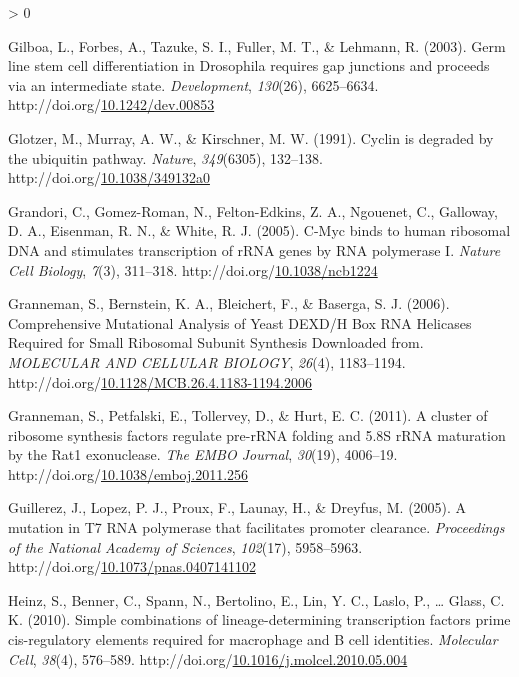 \documentclass[12pt,oneside]{reedthesis}
\newlength{\cslhangindent}
\newenvironment{CSLReferences}[2] %
 {%
  \setlength{\parindent}{0pt}
  \ifodd #1 \everypar{\setlength{\hangindent}{\cslhangindent}}\ignorespaces\fi
  \ifnum #2 > 0
  \setlength{\parskip}{#2\baselineskip}
  \fi
 }%
 {}
\begin{document}
\begin{CSLReferences}{1}{0}
\leavevmode\hypertarget{ref-gilboaGermLineStem2003}{}%
Gilboa, L., Forbes, A., Tazuke, S. I., Fuller, M. T., \& Lehmann, R. (2003). Germ line stem cell differentiation in {Drosophila} requires gap junctions and proceeds via an intermediate state. \emph{Development}, \emph{130}(26), 6625--6634. http://doi.org/\href{https://doi.org/10.1242/dev.00853}{10.1242/dev.00853}

\leavevmode\hypertarget{ref-glotzerCyclinDegradedUbiquitin1991}{}%
Glotzer, M., Murray, A. W., \& Kirschner, M. W. (1991). Cyclin is degraded by the ubiquitin pathway. \emph{Nature}, \emph{349}(6305), 132--138. http://doi.org/\href{https://doi.org/10.1038/349132a0}{10.1038/349132a0}

\leavevmode\hypertarget{ref-grandoriCMycBindsHuman2005}{}%
Grandori, C., Gomez-Roman, N., Felton-Edkins, Z. A., Ngouenet, C., Galloway, D. A., Eisenman, R. N., \& White, R. J. (2005). C-{Myc} binds to human ribosomal {DNA} and stimulates transcription of {rRNA} genes by {RNA} polymerase {I}. \emph{Nature Cell Biology}, \emph{7}(3), 311--318. http://doi.org/\href{https://doi.org/10.1038/ncb1224}{10.1038/ncb1224}

\leavevmode\hypertarget{ref-Granneman2006}{}%
Granneman, S., Bernstein, K. A., Bleichert, F., \& Baserga, S. J. (2006). Comprehensive {Mutational Analysis} of {Yeast DEXD}/{H Box RNA Helicases Required} for {Small Ribosomal Subunit Synthesis Downloaded} from. \emph{MOLECULAR AND CELLULAR BIOLOGY}, \emph{26}(4), 1183--1194. http://doi.org/\href{https://doi.org/10.1128/MCB.26.4.1183-1194.2006}{10.1128/MCB.26.4.1183-1194.2006}

\leavevmode\hypertarget{ref-Granneman2011}{}%
Granneman, S., Petfalski, E., Tollervey, D., \& Hurt, E. C. (2011). A cluster of ribosome synthesis factors regulate pre-{rRNA} folding and 5.{8S rRNA} maturation by the {Rat1} exonuclease. \emph{The EMBO Journal}, \emph{30}(19), 4006--19. http://doi.org/\href{https://doi.org/10.1038/emboj.2011.256}{10.1038/emboj.2011.256}

\leavevmode\hypertarget{ref-guillerezMutationT7RNA2005}{}%
Guillerez, J., Lopez, P. J., Proux, F., Launay, H., \& Dreyfus, M. (2005). A mutation in {T7 RNA} polymerase that facilitates promoter clearance. \emph{Proceedings of the National Academy of Sciences}, \emph{102}(17), 5958--5963. http://doi.org/\href{https://doi.org/10.1073/pnas.0407141102}{10.1073/pnas.0407141102}

\leavevmode\hypertarget{ref-heinzSimpleCombinationsLineagedetermining2010}{}%
Heinz, S., Benner, C., Spann, N., Bertolino, E., Lin, Y. C., Laslo, P., \ldots{} Glass, C. K. (2010). Simple combinations of lineage-determining transcription factors prime cis-regulatory elements required for macrophage and {B} cell identities. \emph{Molecular Cell}, \emph{38}(4), 576--589. http://doi.org/\href{https://doi.org/10.1016/j.molcel.2010.05.004}{10.1016/j.molcel.2010.05.004}


\end{CSLReferences}
\end{document}
